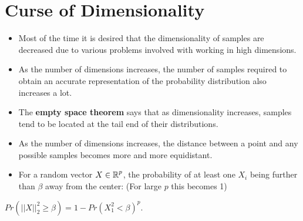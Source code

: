 \documentclass[english]{latex4ei/latex4ei_sheet}
\begin{document}
\section{Curse of Dimensionality}
\begin{sectionbox}
\begin{itemize}
\item Most of the time it is desired that the dimensionality of samples are decreased due to various problems involved with working in high dimensions.
\item As the number of dimensions increases, the number of samples required to obtain an accurate representation of the probability distribution also increases a lot.
\item The \textbf{empty space theorem} says that as dimensionality increases, samples tend to be located at the tail end of their distributions.
\item As the number of dimensions increases, the distance between a point and any possible samples becomes more and more equidistant.
\item For a random vector $X\in\operatorname{\mathbb R}^p$, the probability of at least one $X_i$ being further than $\beta$ away from the center: (For large $p$ this becomes 1)
\end{itemize}
\begin{emphbox}
$Pr(||X||^2_2\ge\beta)=1-Pr(X_1^2<\beta)^p$. 
\end{emphbox}
\end{sectionbox}
\end{document}
